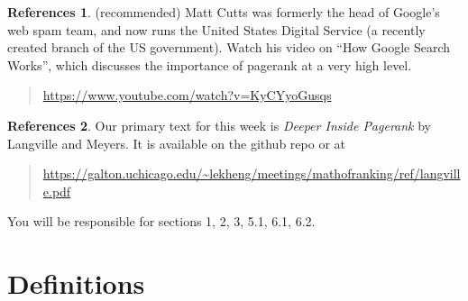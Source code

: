 \documentclass[10pt]{article}
\theoremstyle{definition}
\newtheorem{problem}{Problem}
\newtheorem{refr}{References}
\begin{document}
\begin{refr}
    (recommended)
    Matt Cutts was formerly the head of Google's web spam team,
    and now runs the United States Digital Service (a recently created branch of the US government).
    Watch his video on ``How Google Search Works'', which discusses the importance of pagerank at a very high level.
    \begin{quote}
    \url{https://www.youtube.com/watch?v=KyCYyoGusqs}
    \end{quote}
\end{refr}

\begin{refr}
    Our primary text for this week is \emph{Deeper Inside Pagerank} by Langville and Meyers.
    It is available on the github repo or at
    \begin{quote}
    \url{https://galton.uchicago.edu/~lekheng/meetings/mathofranking/ref/langville.pdf}
    \end{quote}
    You will be responsible for sections 1, 2, 3, 5.1, 6.1, 6.2.
\end{refr}

%

\newpage
\section{Definitions}
\end{document}
